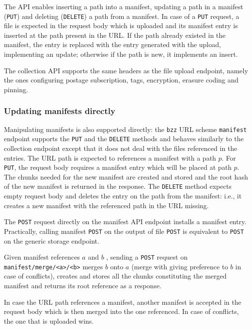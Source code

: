 The API enables inserting a path into a manifest, updating a path in a manifest (\lstinline{PUT}) and deleting (\lstinline{DELETE}) a path from a manifest. In case of a \lstinline{PUT} request, a file is expected in the request body which is uploaded and its manifest entry is inserted at the path present in the URL. If the path already existed in the manifest, the entry is replaced with the entry generated with the upload, implementing an update; otherwise if the path is new, it implements an insert. 

The collection API supports the same headers as the file upload endpoint, namely the ones configuring postage subscription, tags, encryption, erasure coding and pinning.

\subsubsection{Updating manifests directly}

Manipulating manifests is also supported directly: the \lstinline{bzz} URL scheme \lstinline{manifest} endpoint supports the \lstinline{PUT} and the \lstinline{DELETE} methods and behaves similarly to the collection endpoint except that it does not deal with the files referenced in the entries. The  URL path is expected to references a manifest with a path $p$. For \lstinline{PUT}, the request body requires a manifest entry which will be placed at path $p$. The chunks needed for the new manifest are created and stored and the root  hash of the  new manifest is returned in the response. The  \lstinline{DELETE} method expects empty request body  and deletes the entry on the path from the manifest: i.e., it creates a new manifest with the referenced path in  the URL missing. 

The \lstinline{POST} request directly on the manifest API endpoint installs a manifest entry. Practically, calling manifest     \lstinline{POST} on the output of file \lstinline{POST} is equivalent to \lstinline{POST} on the generic storage endpoint.  

Given manifest references $a$ and $b$ , sending a \lstinline{POST} request on \lstinline{manifest/merge/<a>/<b>} 
merges $b$ onto $a$ (merge with giving preference to $b$ in case of conflicts), creates and stores all the chunks constituting the merged manifest and returns its root reference as a response.


In case the URL path references a manifest, another manifest is accepted in the request body which is then merged into the one referenced. In case of conflicts, the one that is uploaded wins. 


